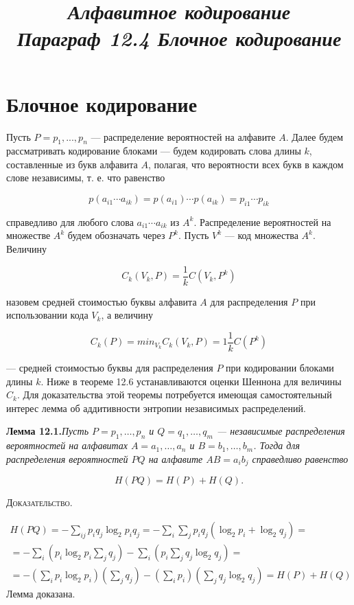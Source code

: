 \documentclass[12pt]{article}
\title{\Huge{\it Алфавитное кодирование\\
		Параграф 12.4 Блочное кодирование	}}
\date{}
\numberwithin{equation}{section}
\begin{document}
    \maketitle
    \newpage
    
    \section{Блочное кодирование}
    Пусть $P = {p_{1},...,p_{n}}$ — распределение вероятностей на алфавите
    $A$. Далее будем рассматривать кодирование блоками — будем кодировать слова длины $k$, составленные из букв алфавита $A$, полагая, что вероятности всех букв в каждом слове независимы, т. е. что равенство
    
     $$ p (a_{i1} \cdots a_{ik} ) = p (a_{i1} )\cdots p (a_{ik} ) = p_{i1} \cdots p_{ik} $$
     
справедливо для любого слова $ a_{i1} \cdots a_{ik} $ из $ A^{k} $. Распределение вероятностей на множестве $ A^{k} $ будем обозначать через $ P^{k} $. Пусть $ V^{k} $ — код множества $ A^{k} $.
    Величину
   
   $$ C_{k}(V_{k}, P) = \frac{1}{k} C(V_{k}, P^{k}) $$
   
    назовем средней стоимостью буквы алфавита $ A $ для распределения
    $ P $ при использовании кода  $ V_{k} $, а величину
    
    $$ C_{k} (P) = min_{V_{k}} C_{k}(V_{k},P) = 1\frac{1}{k} C(P^{k}) $$
    
— средней стоимостью буквы для распределения $ P $ при кодировании блоками длины $ k $. Ниже в теореме 12.6 устанавливаются оценки Шеннона для величины $ C_{k} $. Для доказательства этой теоремы потребуется имеющая самостоятельный интерес лемма об аддитивности энтропии независимых распределений.



{\bf Лемма 12.1.}{\it Пусть $ P = {p_{1},\ldots,p_{n}} $ и $ Q = {q_{1},\ldots,q_{m}} $ — независимые распределения вероятностей на алфавитах
$A = {a_{1},\ldots,a_{n}}$ и $ B = {b_{1},\ldots,b_{m}} $. Тогда для распределения вероятностей $ PQ $ на алфавите $ AB = {a_{i}b_{j}} $ справедливо равенство}

$$ H(P Q) = H(P) + H(Q). $$


\textsc{Доказательство.}
 
\begin{multline*}
 H(PQ) = -\sum_{ij} p_{i} q_{j} \log_{2} p_{i}q_{j} = -\sum_{i}\sum_{j}p_{i}q_{j} (\log_{2} p_{i} + \log_{2} q_{j} ) =\\ =-\sum_{i}( p_{i} \log_{2}p_{i} \sum_{j} q_{j}) -\sum_{i}( p_{i} \sum_{j} q_{j}\log_{2}q_{j} )=\\ =- (\sum_{i} p_{i} \log_{2}p_{i})(\sum_{j} q_{j}) - (\sum_{i} p_{i})(\sum_{j} q_{j}\log_{2}q_{j})= H(P)+H(Q)
 \end{multline*} 
Лемма доказана.
\end{document}
